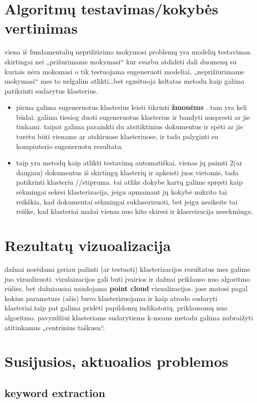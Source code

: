 \documentclass{VUMIFInfBakalaurinis}
\begin{document}
\section{Algoritmų testavimas/kokybės vertinimas}
	viena iš fundamentalių neprižiūrimo mokymosi problemų yra modelių testavimas. skirtingai nei „prižurimame mokymasi“ kur svarbu atdidėti dali duomenų su kuriais nėra mokomasi o tik testuojama sugeneruoti modeliai, „neprižiurimame mokymasi“ mes to nelgalim atlikti\ldots bet egzsituoja keltatas metodu kaip galima patikrinti sudarytus klasterius.
	\begin{itemize}
		\item pirma galima sugeneruotus klasterius leisti tikrinti \textbf{žmonėms }. tam yra keli būdai. galima tiesiog duoti sugeneruotus klasterius ir bandyti nuspresti ar jie tinkami. taipat galima parainkti du atsitiktinius dokumentus ir spėti ar jie turėtu būti viename ar atskiruose klasteriuose, ir tada palyginti su kompiuterio sugeneruotu rezultatu. 
		\item taip yra metodų kaip atlikti testavimą automatiškai. vienas jų paimti 2(ar daugiau) dokumentus iš skirtingų klasterių ir apkeisti juos vietomis, tada patikrinti klasteriu //stipruma. tai atlike dokybe kartų galime spręsti kaip sėkmingai sekėsi klasterizacija, jeigu apmainant jų kokybė nukrito tai reikškia, kad dokumentai sėkmingai suklaserizuoti, bet jeigu nesikeite tai reiške, kad klasteriai mažai vienas nuo kito skiresi ir klasreizacija nesekminga.
	\end{itemize}

\section{Rezultatų vizuoalizacija}
	dažnai norėdami geriau pažinti (ar testuoti) klasterizacijos rezultatus mes galime juo vizuolizuoti. vizulaizacijos gali buti įvairios ir dažnai priklauso nuo algoritmo rūšies, bet dažniausiai naudojama \textbf{point cloud} vizualizacijos. jose matosi pagal kokius parameturs (ašis) buvo klasterizuojama ir kaip atrodo sudaryti klasteriai.taip pat galima pridėti papildomų indikatorių, priklausomų nuo algoritmo. pavyzdžiui klasteriams sudarytiems k-means metodu galima nubraižyti atitinkamus „centrinius taškusn“.

\section{Susijusios, aktuoalios problemos}
	\subsection{keyword extraction}
\end{document}
